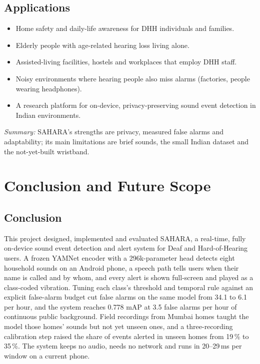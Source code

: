 \documentclass[12pt,a4paper,oneside]{report}
\begin{document}
\section{Applications}
\begin{itemize}[itemsep=2pt]
\item Home safety and daily-life awareness for DHH individuals and families.
\item Elderly people with age-related hearing loss living alone.
\item Assisted-living facilities, hostels and workplaces that employ DHH staff.
\item Noisy environments where hearing people also miss alarms (factories, people wearing headphones).
\item A research platform for on-device, privacy-preserving sound event detection in Indian environments.
\end{itemize}

\textit{Summary:} SAHARA's strengths are privacy, measured false alarms and adaptability; its main limitations are brief sounds, the small Indian dataset and the not-yet-built wristband.

\chapter{Conclusion and Future Scope}
\section{Conclusion}
This project designed, implemented and evaluated SAHARA, a real-time, fully on-device sound event detection and alert system for Deaf and Hard-of-Hearing users. A frozen YAMNet encoder with a 296k-parameter head detects eight household sounds on an Android phone, a speech path tells users when their name is called and by whom, and every alert is shown full-screen and played as a class-coded vibration. Tuning each class's threshold and temporal rule against an explicit false-alarm budget cut false alarms on the same model from 34.1 to 6.1 per hour, and the system reaches 0.778 mAP at 3.5 false alarms per hour of continuous public background. Field recordings from Mumbai homes taught the model those homes' sounds but not yet unseen ones, and a three-recording calibration step raised the share of events alerted in unseen homes from 19\,\% to 35\,\%. The system keeps no audio, needs no network and runs in 20--29\,ms per window on a current phone.
\end{document}
